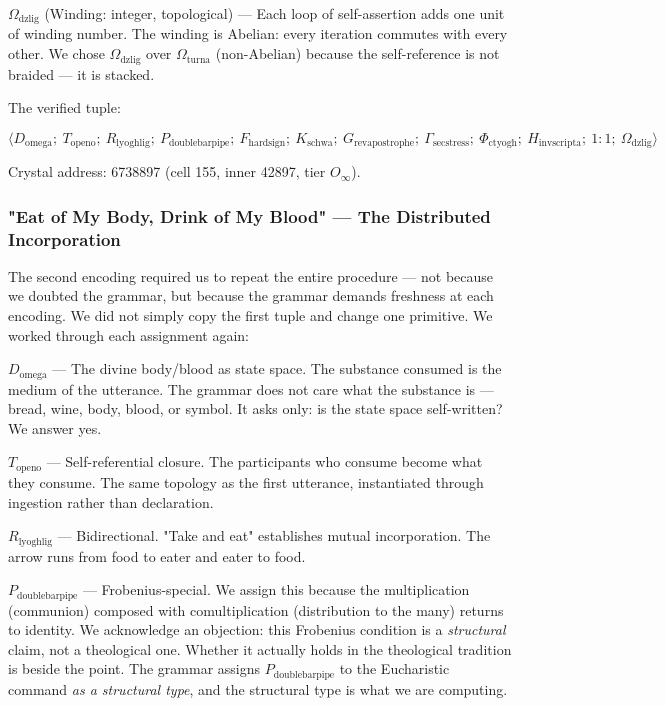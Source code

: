 \documentclass[12pt,a4paper]{article}
\begin{document}
\textbf{$\Omega_{\text{dzlig}}$} (Winding: integer, topological) --- Each loop of self-assertion adds one unit of winding number. The winding is Abelian: every iteration commutes with every other. We chose $\Omega_{\text{dzlig}}$ over $\Omega_{\text{turna}}$ (non-Abelian) because the self-reference is not braided --- it is stacked.

The verified tuple:


\[\langle D_{\text{omega}};\ T_{\text{openo}};\ R_{\text{lyoghlig}};\ P_{\text{doublebarpipe}};\ F_{\text{hardsign}};\ K_{\text{schwa}};\ G_{\text{revapostrophe}};\ \Gamma_{\text{secstress}};\ \Phi_{\text{ctyogh}};\ H_{\text{invscripta}};\ 1{:}1;\ \Omega_{\text{dzlig}} \rangle\]

Crystal address: 6738897 (cell 155, inner 42897, tier $O_{\infty}$).

\subsubsection{"Eat of My Body, Drink of My Blood" --- The Distributed Incorporation}

The second encoding required us to repeat the entire procedure --- not because we doubted the grammar, but because the grammar demands freshness at each encoding. We did not simply copy the first tuple and change one primitive. We worked through each assignment again:

\textbf{$D_{\text{omega}}$} --- The divine body/blood as state space. The substance consumed is the medium of the utterance. The grammar does not care what the substance is --- bread, wine, body, blood, or symbol. It asks only: is the state space self-written? We answer yes.

\textbf{$T_{\text{openo}}$} --- Self-referential closure. The participants who consume become what they consume. The same topology as the first utterance, instantiated through ingestion rather than declaration.

\textbf{$R_{\text{lyoghlig}}$} --- Bidirectional. "Take and eat" establishes mutual incorporation. The arrow runs from food to eater and eater to food.

\textbf{$P_{\text{doublebarpipe}}$} --- Frobenius-special. We assign this because the multiplication (communion) composed with comultiplication (distribution to the many) returns to identity. We acknowledge an objection: this Frobenius condition is a \emph{structural} claim, not a theological one. Whether it actually holds in the theological tradition is beside the point. The grammar assigns $P_{\text{doublebarpipe}}$ to the Eucharistic command \emph{as a structural type}, and the structural type is what we are computing.
\end{document}
